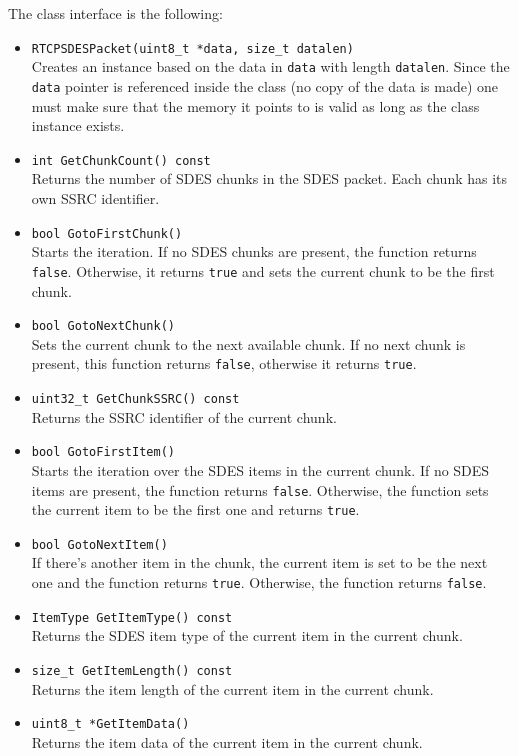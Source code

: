 \documentclass[12pt,a4paper]{article}
\begin{document}
					The class interface is the following:
					\begin{itemize}
						\item {\tt RTCPSDESPacket(uint8\_t *data, size\_t datalen)}\\
							Creates an instance based on the data in {\tt data} with
							length {\tt datalen}. Since the {\tt data} pointer
							is referenced inside the class (no copy of the data is
							made) one must make sure that the memory it points to is
							valid as long as the class instance exists.
						\item {\tt int GetChunkCount() const}\\
							Returns the number of SDES chunks in the SDES packet.
							Each chunk has its own SSRC identifier.
						\item {\tt bool GotoFirstChunk()}\\
							Starts the iteration. If no SDES chunks are present,
							the function returns {\tt false}. Otherwise, it
							returns {\tt true} and sets the current chunk to be
							the first chunk.
						\item {\tt bool GotoNextChunk()}\\
							Sets the current chunk to the next available chunk.
							If no next chunk is present, this function returns
							{\tt false}, otherwise it returns {\tt true}.
						\item {\tt uint32\_t GetChunkSSRC() const}\\
							Returns the SSRC identifier of the current chunk.
						\item {\tt bool GotoFirstItem()}\\
							Starts the iteration over the SDES items in the current
							chunk. If no SDES items are present, the function returns
							{\tt false}. Otherwise, the function sets the current item
							to be the first one and returns {\tt true}.
						\item {\tt bool GotoNextItem()}\\
							If there's another item in the chunk, the current item
							is set to be the next one and the function returns {\tt true}.
							Otherwise, the function returns {\tt false}.
						\item {\tt ItemType GetItemType() const}\\
							Returns the SDES item type of the current item in the current
							chunk.
						\item {\tt size\_t GetItemLength() const}\\
							Returns the item length of the current item in the current
							chunk.
						\item {\tt uint8\_t *GetItemData()}\\
							Returns the item data of the current item in the current
							chunk.
					\end{itemize}
\end{document}
